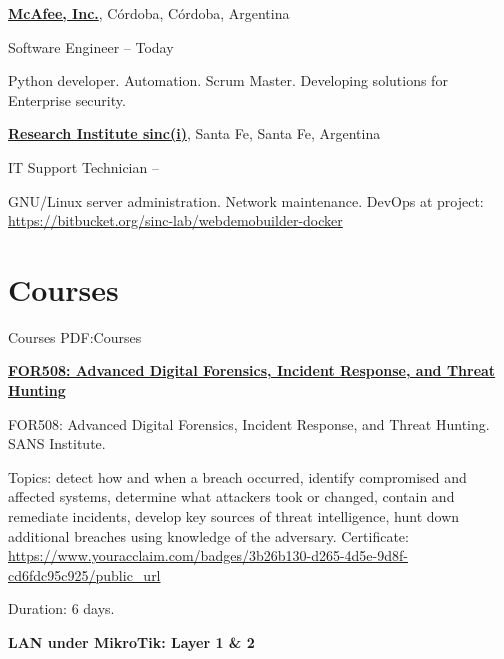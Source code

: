 \documentclass[letterpaper,MMMyyyy,nonstop]{simpleresumecv}
\begin{document}
\begin{body}
\href{http://www.mcafee.com}
{\textbf{McAfee, Inc.}},
Córdoba, Córdoba, Argentina

\GapNoBreak
\BulletItem
Software Engineer
\hfill
{} --
Today
\begin{detail}
	\SubBulletItem
	Python developer.
	\SubBulletItem
	Automation.
	\SubBulletItem
	Scrum Master.
	\SubBulletItem
	Developing solutions for Enterprise security.
\end{detail}

\href{http://www.sinc.unl.edu.ar}
{\textbf{Research Institute sinc(i)}},
Santa Fe, Santa Fe, Argentina

\GapNoBreak
\BulletItem
IT Support Technician
\hfill
{} --
\begin{detail}
\SubBulletItem
GNU/Linux server administration.
\SubBulletItem
Network maintenance.
\SubBulletItem
DevOps at project: \href{https://bitbucket.org/sinc-lab/webdemobuilder-docker}{https://bitbucket.org/sinc-lab/webdemobuilder-docker}
\end{detail}


\section
{Courses}
{Courses}
{PDF:Courses}


\href{https://www.sans.org/course/advanced-incident-response-threat-hunting-training}{\textbf{FOR508: Advanced Digital Forensics, Incident Response, and Threat Hunting}}
\hfill
{}

\BulletItem FOR508: Advanced Digital Forensics, Incident Response, and Threat Hunting. SANS Institute.
\begin{detail}
	\SubBulletItem 
	Topics: detect how and when a breach occurred, identify compromised and affected systems, determine what attackers took or changed, contain and remediate incidents, develop key sources of threat intelligence, hunt down additional breaches using knowledge of the adversary.	
	\SubBulletItem
	Certificate: \href{https://www.youracclaim.com/badges/3b26b130-d265-4d5e-9d8f-cd6fdc95c925/public\_url}{https://www.youracclaim.com/badges/3b26b130-d265-4d5e-9d8f-cd6fdc95c925/public\_url}
\end{detail}
Duration: 6 days.

\BigGap
\textbf{LAN under MikroTik: Layer 1 \& 2}
\hfill
{}


\end{body}
\end{document}
